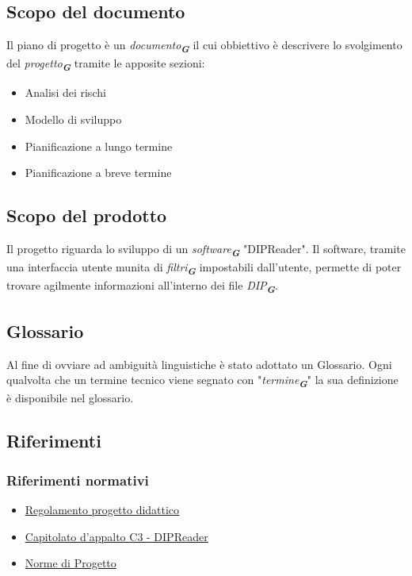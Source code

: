 \documentclass[a4paper,12pt]{article}
\newcommand{\glossario}[1]{\textit{#1}\textsubscript{\textbf{\textit{\textcolor{lightblack}{G}}}}}
\begin{document}
\subsection{Scopo del documento}
Il piano di progetto è un \glossario{documento} il cui obbiettivo è descrivere lo svolgimento del \glossario{progetto} tramite le apposite sezioni: 
\begin{itemize}
    \item Analisi dei rischi
    \item Modello di sviluppo
    \item Pianificazione a lungo termine
    \item Pianificazione a breve termine
\end{itemize}
\subsection{Scopo del prodotto}
Il progetto riguarda lo sviluppo di un \glossario{software} "DIPReader". Il software, tramite una interfaccia utente munita di \glossario{filtri} impostabili dall'utente, permette di poter trovare agilmente informazioni all'interno dei file \glossario{DIP}.
\subsection{Glossario}
Al fine di ovviare ad ambiguità linguistiche è stato adottato un Glossario. Ogni qualvolta che un termine tecnico viene segnato con "\glossario{termine}" la sua definizione è disponibile nel glossario.

\subsection{Riferimenti}
\subsubsection{Riferimenti normativi}
\begin{itemize}
    \item \href{https://www.math.unipd.it/~tullio/IS-1/2025/Dispense/PD1.pdf}{\ul{Regolamento progetto didattico}}  
    \item \href{https://www.math.unipd.it/~tullio/IS-1/2025/Progetto/C3.pdf}{\ul{Capitolato d'appalto C3 - DIPReader}}  
    \item \href{https://7-zpus.github.io/Docs/assets/2_RTB/DocumentiInterni/NormeDiProgetto.pdf}{Norme di Progetto} 
\end{itemize}
\end{document}
